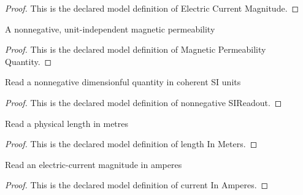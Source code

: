 \begin{proof}
  This is the declared model definition of Electric Current Magnitude.
\end{proof}
\begin{definition}
  \label{def:physics:phyx-mini-0964:phyxminiproblems-problemphyxmini0964-magneticpermeabilityquantity}
  A nonnegative, unit-independent magnetic permeability
\end{definition}
\begin{proof}
  This is the declared model definition of Magnetic Permeability Quantity.
\end{proof}
\begin{definition}
  \label{def:physics:phyx-mini-0964:phyxminiproblems-problemphyxmini0964-nonnegativesireadout}
  Read a nonnegative dimensionful quantity in coherent SI units
\end{definition}
\begin{proof}
  This is the declared model definition of nonnegative SIReadout.
\end{proof}
\begin{definition}
  \label{def:physics:phyx-mini-0964:phyxminiproblems-problemphyxmini0964-lengthinmeters}
  Read a physical length in metres
\end{definition}
\begin{proof}
  This is the declared model definition of length In Meters.
\end{proof}
\begin{definition}
  \label{def:physics:phyx-mini-0964:phyxminiproblems-problemphyxmini0964-currentinamperes}
  Read an electric-current magnitude in amperes
\end{definition}
\begin{proof}
  This is the declared model definition of current In Amperes.
\end{proof}
